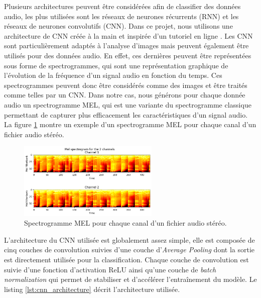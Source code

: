 Plusieurs architectures peuvent être considérées afin de classifier des données audio, les plus utilisées sont les réseaux de neurones récurrents (RNN) et les réseaux de neurones convolutifs (CNN). Dans ce projet, nous utilisons une architecture de CNN créée à la main et inspirée d'un tutoriel en ligne \cite{cnn_tuto}. Les CNN sont particulièrement adaptés à l'analyse d'images mais peuvent également être utilisés pour des données audio. En effet, ces dernières peuvent être représentées sous forme de spectrogrammes, qui sont une représentation graphique de l'évolution de la fréquence d'un signal audio en fonction du temps. Ces spectrogrammes peuvent donc être considérés comme des images et être traités comme telles par un CNN. Dans notre cas, nous générons pour chaque donnée audio un spectrogramme MEL, qui est une variante du spectrogramme classique permettant de capturer plus efficacement les caractéristiques d'un signal audio. La figure \ref{fig:spectrogram} montre un exemple d'un spectrogramme MEL pour chaque canal d'un fichier audio stéréo.

\begin{figure}[H]
    \centering
    \includegraphics[width=0.6\textwidth]{rsc/spectrogram.png}
    \caption{Spectrogramme MEL pour chaque canal d'un fichier audio stéréo.}
    \label{fig:spectrogram}
\end{figure}

L'architecture du CNN utilisée est globalement assez simple, elle est composée de cinq couches de convolution suivies d'une couche d'\textit{Average Pooling} dont la sortie est directement utilisée pour la classification. Chaque couche de convolution est suivie d'une fonction d'activation ReLU ainsi qu'une couche de \textit{batch normalization} qui permet de stabiliser et d'accélérer l'entraînement du modèle. Le listing \ref{lst:cnn_architecture} décrit l'architecture utilisée.

